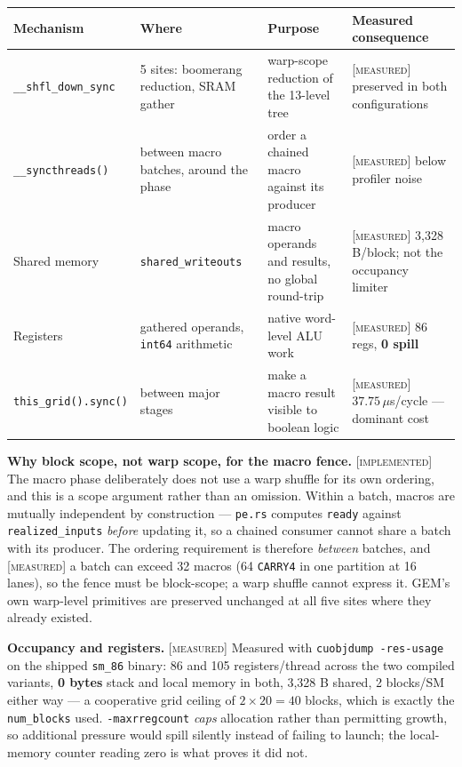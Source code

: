 \documentclass[11pt]{article}
\newcommand{\M}{\textcolor{blue!45!black}{\scriptsize\textsc{[measured]}}}
\newcommand{\I}{\textcolor{note}{\scriptsize\textsc{[implemented]}}}
\newcommand{\code}[1]{\texttt{\small #1}}
\begin{document}
\begin{center}\footnotesize
\begin{tabular}{@{}p{}p{}p{}p{}@{}}
\toprule
Mechanism & Where & Purpose & Measured consequence\\
\midrule
\code{\_\_shfl\_down\_sync} & 5 sites: boomerang reduction, SRAM gather & warp-scope reduction of the 13-level tree & \M{} preserved in both configurations\\
\code{\_\_syncthreads()} & between macro batches, around the phase & order a chained macro against its producer & \M{} below profiler noise\\
Shared memory & \code{shared\_writeouts} & macro operands and results, no global round-trip & \M{} 3,328 B/block; not the occupancy limiter\\
Registers & gathered operands, \code{int64} arithmetic & native word-level ALU work & \M{} 86 regs, \textbf{0 spill}\\
\code{this\_grid().sync()} & between major stages & make a macro result visible to boolean logic & \M{} $37.75\,\mu$s/cycle --- dominant cost\\
\bottomrule
\end{tabular}
\end{center}

\textbf{Why block scope, not warp scope, for the macro fence.} \I{} The macro phase
deliberately does not use a warp shuffle for its own ordering, and this is a scope
argument rather than an omission. Within a batch, macros are mutually independent by
construction --- \code{pe.rs} computes \code{ready} against \code{realized\_inputs}
\emph{before} updating it, so a chained consumer cannot share a batch with its
producer. The ordering requirement is therefore \emph{between} batches, and \M{} a
batch can exceed 32 macros (64 \code{CARRY4} in one partition at 16 lanes), so the
fence must be block-scope; a warp shuffle cannot express it. GEM's own warp-level
primitives are preserved unchanged at all five sites where they already existed.

\textbf{Occupancy and registers.} \M{} Measured with \code{cuobjdump -res-usage} on
the shipped \code{sm\_86} binary: 86 and 105 registers/thread across the two compiled
variants, \textbf{0 bytes} stack and local memory in both, 3,328 B shared, 2 blocks/SM
either way --- a cooperative grid ceiling of $2\times 20 = 40$ blocks, which is exactly
the \code{num\_blocks} used. \code{-maxrregcount} \emph{caps} allocation rather than
permitting growth, so additional pressure would spill silently instead of failing to
launch; the local-memory counter reading zero is what proves it did not.
\end{document}
